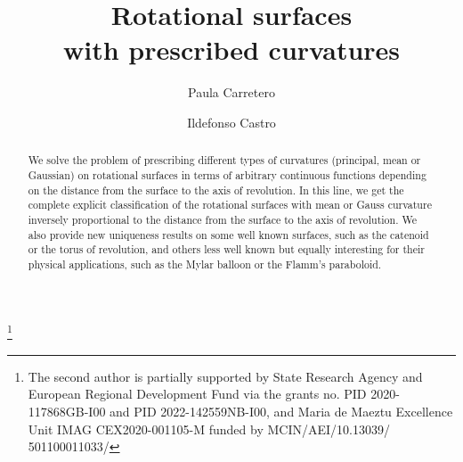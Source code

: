\documentclass[leqno,11pt]{amsart}
\theoremstyle{definition}
\numberwithin{equation}{section}
\begin{document}
\title[Rotational surfaces with prescribed curvatures]{Rotational surfaces \\ with prescribed curvatures }

\author[P. Carretero]{Paula Carretero}
\address{Departamento de Matem\'aticas \\
	Universidad de Ja\'{e}n \\
	23071 Ja\'{e}n, Spain.}

\author[I. Castro]{Ildefonso Castro}
\address{Departamento de Matem\'{a}ticas \\
	Universidad de Ja\'{e}n \\
	23071 Ja\'{e}n, Spain and IMAG, Instituto de Matem\'aticas de la Universidad de Granada.}




\thanks{The second author is partially supported by State Research Agency and European
	Regional Development Fund via the grants no. PID 2020-117868GB-I00 and PID 2022-142559NB-I00, and Maria de Maeztu Excellence Unit IMAG CEX2020-001105-M funded by MCIN/AEI/10.13039/ 501100011033/
}



\date{}



\begin{abstract}
	We solve the problem of prescribing different types of curvatures (principal, mean or Gaussian) on rotational surfaces in terms of arbitrary continuous functions depending on the distance from the surface to the axis of revolution. In this line, we get the complete explicit classification of the rotational surfaces with mean or Gauss curvature inversely proportional to the distance from the surface to the axis of revolution. We also provide new uniqueness results on some well known surfaces, such as the catenoid or the torus of revolution,
	and others less well known but equally interesting for their physical applications, such as the Mylar balloon or the Flamm's paraboloid.
\end{abstract}



\maketitle
\end{document}
